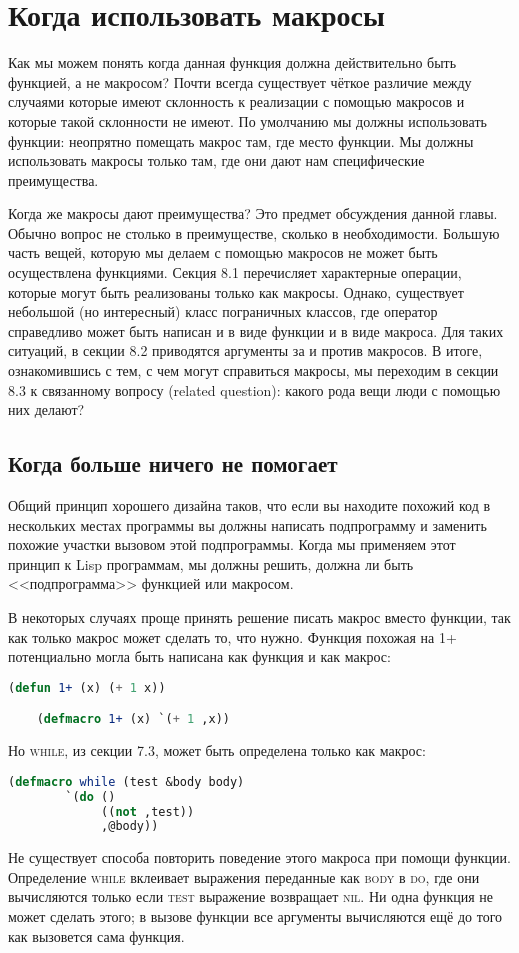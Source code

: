 \documentclass[12pt, a4paper]{article} %
\begin{document}
\section{Когда использовать макросы}

Как мы можем понять когда данная функция должна действительно быть функцией, а не макросом? Почти всегда существует чёткое различие между случаями которые имеют склонность к реализации с помощью макросов и которые такой склонности не имеют. По умолчанию мы должны использовать функции: неопрятно помещать макрос там, где место функции. Мы должны использовать макросы только там, где они дают нам специфические преимущества. 

Когда же макросы дают преимущества? Это предмет обсуждения данной главы. Обычно вопрос не столько в преимуществе, сколько в необходимости. Большую часть вещей, которую мы делаем с помощью макросов не может быть осуществлена функциями. Секция 8.1 перечисляет характерные операции, которые могут быть реализованы только как макросы. Однако, существует небольшой (но интересный) класс пограничных классов, где оператор справедливо может быть написан и в виде функции и в виде макроса. Для таких ситуаций, в секции 8.2 приводятся аргументы за и против макросов. В итоге, ознакомившись с тем, с чем могут справиться макросы, мы переходим в секции 8.3 к связанному вопросу (related question): какого рода вещи люди с помощью них делают?

\subsection{Когда больше ничего не помогает}

Общий принцип хорошего дизайна таков, что если вы находите похожий код в нескольких местах программы вы должны написать подпрограмму и заменить похожие участки вызовом этой подпрограммы. Когда мы применяем этот принцип к Lisp программам, мы должны решить, должна ли быть <<подпрограмма>> функцией или макросом.

В некоторых случаях проще принять решение писать макрос вместо функции, так как только макрос может сделать то, что нужно. Функция похожая на \textsc{1+} потенциально могла быть написана как функция и как макрос:
\begin{lstlisting}[language=Lisp]
    (defun 1+ (x) (+ 1 x))

    (defmacro 1+ (x) `(+ 1 ,x))
\end{lstlisting}
Но \textsc{while}, из секции 7.3, может быть определена только как макрос:
\begin{lstlisting}[language=Lisp]
    (defmacro while (test &body body)
        `(do ()
             ((not ,test))
             ,@body))
\end{lstlisting}
Не существует способа повторить поведение этого макроса при помощи функции. Определение \textsc{while} вклеивает выражения переданные как \textsc{body} в \textsc{do}, где они вычисляются только если \textsc{test} выражение возвращает \textsc{nil}. Ни одна функция не может сделать этого; в вызове функции все аргументы вычисляются ещё до того как вызовется сама функция.
\end{document}
